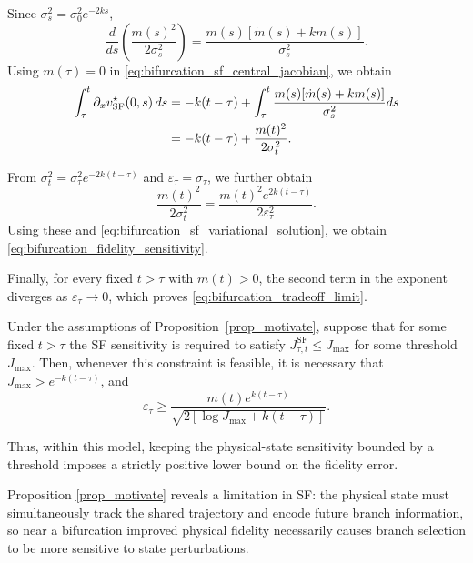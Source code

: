 Since $\sigma_s^2=\sigma_0^2e^{-2ks}$,
\begin{equation}
    \frac{d}{ds}
    \left(
        \frac{m(s)^2}{2\sigma_s^2}
    \right)
    =
    \frac{
        m(s)[\dot m(s)+km(s)]
    }{
        \sigma_s^2
    }.
\end{equation}
Using $m(\tau)=0$ in
\eqref{eq:bifurcation_sf_central_jacobian}, we obtain
\begin{align}
    \int_\tau^t
    \partial_xv_{\mathrm{SF}}^\star(0,s)\,ds
    &=
    -k(t-\tau)
    +
    \int_\tau^t
    \frac{
        m(s)[\dot m(s)+km(s)]
    }{
        \sigma_s^2
    }
    ds
    \notag\\
    &=
    -k(t-\tau)
    +
    \frac{m(t)^2}{2\sigma_t^2}.
\end{align}

From
$\sigma_t^2=\sigma_\tau^2e^{-2k(t-\tau)}$ and
$\varepsilon_\tau=\sigma_\tau$, we further obtain
\begin{equation}
    \frac{m(t)^2}{2\sigma_t^2}
    =
    \frac{
        m(t)^2e^{2k(t-\tau)}
    }{
        2\varepsilon_\tau^2
    }.
\end{equation}
Using these and
\eqref{eq:bifurcation_sf_variational_solution}, we  obtain
\eqref{eq:bifurcation_fidelity_sensitivity}. 

Finally, for every fixed
$t>\tau$ with $m(t)>0$, the second term in the exponent diverges as
$\varepsilon_\tau\to0$, which proves
\eqref{eq:bifurcation_tradeoff_limit}.

\begin{vsfcorollary}
\label{cor:sf_fidelity_robustness_lower_bound}
Under the assumptions of
Proposition~\ref{prop_motivate}, suppose that for
some fixed $t>\tau$ the SF sensitivity is required to
satisfy
$J_{\tau,t}^{\mathrm{SF}}\leq J_{\max}$ for some threshold $J_{\max}$. Then,
whenever this constraint is feasible, it is necessary that
$J_{\max}>e^{-k(t-\tau)}$, and
\begin{equation}
    \varepsilon_\tau
    \geq
    \frac{
        m(t)e^{k(t-\tau)}
    }{
        \sqrt{
            2\left[
                \log J_{\max}+k(t-\tau)
            \right]
        }
    }.
    \label{eq:sf_fidelity_lower_bound}
\end{equation}
\end{vsfcorollary}
Thus, within this model,  keeping the
physical-state sensitivity bounded by a threshold imposes a strictly positive lower bound on
the fidelity error.


\begin{tcolorbox}[
  colback=parchment,
  colframe=sandborder,
  boxrule=0.1pt,
  left=8pt,
  right=8pt,
  top=0.3pt,
  bottom=0.3pt
]
\centering
Proposition \ref{prop_motivate} reveals a limitation in  SF:  the physical state must simultaneously track the shared trajectory and encode  future branch information, so near a bifurcation improved physical fidelity necessarily causes branch selection to be more sensitive to state perturbations.
\end{tcolorbox}


